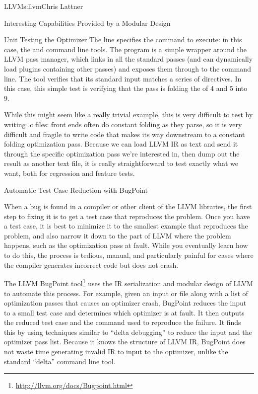 \begin{aosachapter}{LLVM}{s:llvm}{Chris Lattner}
\begin{aosasect1}{Interesting Capabilities Provided by a Modular Design}
\begin{aosasect2}{Unit Testing the Optimizer}
\noindent The  line specifies the command to execute: in this case,
the  and  command line tools.  The
 program is a simple wrapper around the LLVM pass manager,
which links in all the standard passes (and can dynamically load
plugins containing other passes) and exposes them through to the
command line.  The  tool verifies that its standard
input matches a series of  directives.  In this case, this
simple test is verifying that the  pass is folding the
 of 4 and 5 into 9.

While this might seem like a really trivial example, this is very
difficult to test by writing .c files: front ends often do constant
folding as they parse, so it is very difficult and fragile to write
code that makes its way downstream to a constant folding optimization
pass.  Because we can load LLVM IR as text and send it through the
specific optimization pass we're interested in, then dump out the
result as another text file, it is really straightforward to test
exactly what we want, both for regression and feature tests.

\end{aosasect2}

\begin{aosasect2}{Automatic Test Case Reduction with BugPoint}

When a bug is found in a compiler or other client of the LLVM
libraries, the first step to fixing it is to get a test case that
reproduces the problem.  Once you have a test case, it is best to
minimize it to the smallest example that reproduces the problem, and
also narrow it down to the part of LLVM where the problem happens,
such as the optimization pass at fault.  While you eventually learn
how to do this, the process is tedious, manual, and particularly
painful for cases where the compiler generates incorrect code but does
not crash.

The LLVM BugPoint
tool\footnote{\url{http://llvm.org/docs/Bugpoint.html}} uses the IR
serialization and modular design of LLVM to automate this process.
For example, given an input  or  file along with a
list of optimization passes that causes an optimizer crash, BugPoint
reduces the input to a small test case and determines which optimizer
is at fault.  It then outputs the reduced test case and the 
command used to reproduce the failure.  It finds this by using
techniques similar to ``delta debugging'' to reduce the input and the
optimizer pass list.  Because it knows the structure of LLVM IR,
BugPoint does not waste time generating invalid IR to input to the
optimizer, unlike the standard ``delta'' command line tool.


\end{aosasect2}
\end{aosasect1}
\end{aosachapter}
